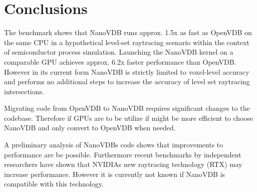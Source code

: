 \section{Conclusions}
The benchmark shows that NanoVDB runs approx. 1.5x as fast as OpenVDB on the same CPU in a hypothetical level-set raytracing scenario within the context of semiconductor process simulation.
Launching the NanoVDB kernel on a comparable GPU achieves approx. 6.2x faster performance than OpenVDB.
However in its current form NanoVDB is strictly limited to voxel-level accuracy and performs no additional steps to increase the accuracy of level set raytracing intersections.

Migrating code from OpenVDB to NanoVDB requires significant changes to the codebase.
Therefore if GPUs are to be utilize if might be more efficient to choose NanoVDB and only convert to OpenVDB when needed.

A preliminary analysis of NanoVDBs code shows that improvements to performance are be possible.
Furthermore recent benchmarks by independent researchers have shown that NVIDIAs new raytracing technology (RTX) may increase performance.
However it is currently not known if NanoVDB is compatible with this technology.
